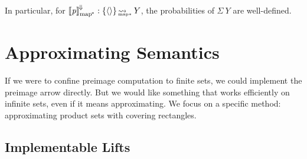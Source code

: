 \documentclass{llncs}
\newcommand{\arrow}{\rightsquigarrow}
\newcommand{\conv}{^{\mspace{-2mu}\Downarrow\mspace{-2mu}}}
\newcommand{\meaningofconv}[1]{\left\llbracket{#1}\right\rrbracket\conv}
\newcommand{\pmap}{_\mathrm{map^{\mspace{-2mu}*}}}
\DeclareMathOperator{\pmapto}{\arrow_{\mspace{-22mu}_{\mathrm{map*}}}}
\begin{document}
In particular, for $\meaningofconv{\mathit{p}}\pmap : \set{\pair{}} \pmapto Y$, the probabilities of $\Sigma~Y$ are well-defined.


\section{Approximating Semantics}
\label{sec:approximating-semantics}

If we were to confine preimage computation to finite sets, we could implement the preimage arrow directly.
But we would like something that works efficiently on infinite sets, even if it means approximating.
We focus on a specific method: approximating product sets with covering rectangles.

\subsection{Implementable Lifts}
\end{document}
